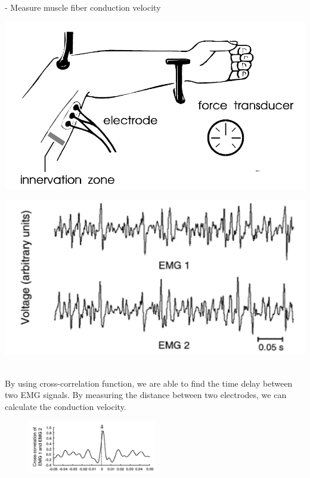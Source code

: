  \begin{ex}{- Measure muscle fiber conduction velocity}
 \begin{minipage}{0.4\textwidth}
 \includegraphics[width=\textwidth]{images/emg3}
 \end{minipage}\hfill
 \begin{minipage}{0.4\textwidth}
 \includegraphics[width=\textwidth]{images/emg1}
 \end{minipage}
\ \\
 By using cross-correlation function, we are able to find the time delay between two EMG signals. By measuring the distance between two electrodes, we can calculate the conduction velocity.
 \begin{figure}[H] \centering
  \includegraphics[width=0.5\textwidth]{images/emg2}
\end{figure}
\end{ex}
 
